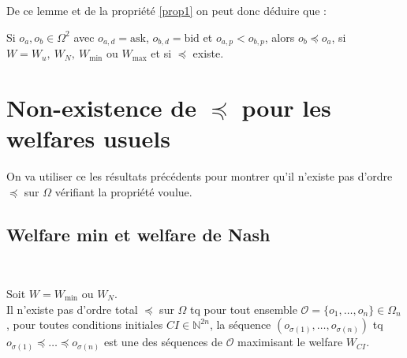 \documentclass[a4paper]{article}
\newcommand{\N}{\mathbb{N}}
\newcommand{\Oc}{\mathcal{O}}
\newtheorem[style=S, bodystyle=\noindent]{thm}{Théorème}[section]
\newtheorem[style=S, bodystyle=\noindent]{defn}[thm]{Définition}
\newtheorem[style=S, bodystyle=\noindent]{propo}[thm]{Proposition}
\newtheorem[style=S, bodystyle=\noindent]{prop}[thm]{Propriété}
\newtheorem[style=S, bodystyle=\noindent]{coro}[thm]{Corollaire}
\newtheorem[style=S, bodystyle=\noindent]{lem}[thm]{Lemme}
\newtheorem[style=S, headstyle=\bfseries\boldmath Théorème, bodystyle=\noindent]{thm*}{Théorème}
\newtheorem[style=S, headstyle=\bfseries\boldmath Définition, bodystyle=\noindent]{defn*}{Définition}
\newtheorem[style=S, headstyle=\bfseries\boldmath Proposition, bodystyle=\noindent]{propo*}{Proposition}
\newtheorem[style=S, headstyle=\bfseries\boldmath Propriété, bodystyle=\noindent]{prop*}{Propriété}
\newtheorem[style=S, headstyle=\bfseries\boldmath Corollaire, bodystyle=\noindent]{coro*}{Corollaire}
\newtheorem[style=S, headstyle=\bfseries\boldmath Lemme, bodystyle=\noindent]{lem*}{Lemme}
\begin{document}
De ce lemme et de la propriété \ref{prop1} on peut donc déduire que :

\begin{prop}
	\label{prop2}
	Si $o_a, o_b \in \Omega^2$ avec $o_{a, d} = \text{ask}$, $o_{b, d} = \text{bid}$ et $o_{a, p} < o_{b,p}$, alors $o_b \preceq o_a$, si $W = W_u,~W_N,~W_{\min}$ ou $W_{\max}$ et si $\preceq$ existe.
\end{prop}


\section{Non-existence de $\preceq$ pour les welfares usuels}

On va utiliser ce les résultats précédents pour montrer qu'il n'existe pas d'ordre $\preceq$ sur $\Omega$ vérifiant la propriété voulue.

\subsection{Welfare min et welfare de Nash}
~
\begin{thm}
	\label{thm1}
	Soit $W = W_{\min}$ ou $W_N$. \\
	Il n'existe pas d'ordre total $\preceq$ sur $\Omega$ tq pour tout ensemble $\Oc = \{o_1, \ldots, o_n\} \in \Omega_n$, pour toutes conditions initiales $CI \in \N^{2n}$, la séquence $(o_{\sigma(1)}, \ldots, o_{\sigma(n)})$ tq $o_{\sigma(1)} \preceq \ldots \preceq o_{\sigma(n)}$ est une des séquences de $\Oc$ maximisant le welfare $W_{CI}$.
\end{thm}
\end{document}
